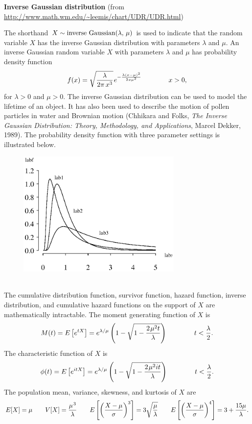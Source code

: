 \documentclass[12pt,fullpage]{article}
\begin{document}
\noindent
{\bf Inverse Gaussian distribution} (from \color{blue}\url{http://www.math.wm.edu/~leemis/chart/UDR/UDR.html}\color{black})

\noindent
The shorthand $X \sim {\rm inverse\ Gaussian}(\lambda,\, \mu)$ is used to indicate that the
random variable $X$ has the inverse Gaussian distribution with parameters $\lambda$ and $\mu$.
An inverse Gaussian random variable $X$ with parameters $\lambda$ and $\mu$ has probability density function 
$$
f(x) = \sqrt {{\frac {\lambda}{2 \pi \, {x} ^ {3}}}} {\kern 0.08 em e ^ {-{\frac {\lambda( x - \mu) ^ {2}} {2 \kern 0.04 em x \mu ^ 2}}}} \qquad \qquad x>0,
$$
for $\lambda > 0$ and $\mu > 0$. 
The inverse Gaussian distribution can be used to model the lifetime of an object.
It has also been used to describe the motion of pollen particles in water and Brownian motion
(Chhikara and Folks, {\it The Inverse Gaussian Distribution:  Theory, Methodology, and Applications}, Marcel Dekker, 1989).
The probability density function with three parameter settings is illustrated below.
{\begin{figure}[h!]
\begin{center}
\includegraphics[width=3.2in]{InversegaussianPlot.ps}
\end{center}
\end{figure}}\\

The cumulative distribution function, survivor function, hazard function, inverse distribution, and cumulative hazard functions on the support of $X$ are mathematically intractable.
The moment generating function of $X$ is
$$
M(t) = E\left[ e ^ {tX} \right] = e ^ {\lambda / \mu}\left(1 - \sqrt{1 - \frac{2 \kern 0.08 em \mu ^ 2 t} {\lambda}}\right) \qquad \qquad t < \frac{\lambda} {2}.
$$
The characteristic function of $X$ is
$$
\phi(t) = E\left[ e ^ {it X} \right] =  e ^ {\lambda / \mu}\left(1 - \sqrt{1 - \frac{2 \kern 0.08 em \mu ^ 2 i t} {\lambda}}\right) \qquad \qquad t < \frac{\lambda} {2}.
$$
The population mean, variance, skewness, and kurtosis of $X$ are
$$
E[X] = \mu \qquad
V[X] = \frac{\mu ^ {\kern 0.08 em 3}} {\lambda} \qquad
E\left[ \left( \frac{X - \mu}{\sigma} \right) ^ 3 \right] = 3 \sqrt{\frac{\mu}{\lambda}} \qquad
E\left[ \left( \frac{X - \mu} {\sigma} \right) ^ 4 \right] = 3 + \frac{15 \mu}{\lambda}.
$$
\end{document}
